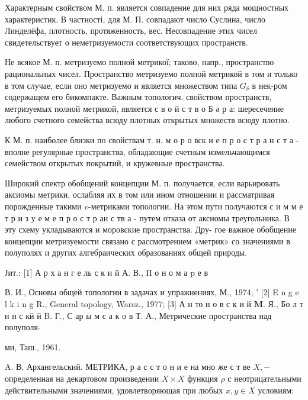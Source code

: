 \documentclass[10pt]{article}
\begin{document}
Характерным свойством М. п. является совпадение для них ряда мощностных характеристик. В частності, для М. П. совпадают число Суслина, число Линделёфа, плотность, протяженность, вес. Несовпадение этих чисел свидетельствует о неметризуемости соответствующих пространств.



Не всякое М. п. метризуемо полной метрикої; таково, напр., пространство рациональных чисел. Пространство метризуемо полной метрикой в том и только в том случае, если оно метризуемо и является множеством типа $G_{\delta}$ в нек-ром содержащем его бикомпакте. Важным топологич. свойством пространств, метризуемых полной метрикой, является с в о й с т в о Б ә р а: шересечение любого счетного семейства всюду плотных открытых множеств всюду плотно.



К М. п. наиболее близки по свойствам т. н. м о р о вск и е п р о с т р а н с т а - вполне регулярные пространства, обладающие счетным измельчающимся семейством открытых покрытий, и кружевные пространства.



Широкий спектр обобщений концепции М. п. получается, если варьировать аксиомы метрики, ослабляя их в том или ином отношении и рассматривая порожденные такими $v$-метриками топологии. На этом пути получаются с и м м е т р и з у е м е п р о с т р ан с тв а - путем отказа от аксиомы треугольника. В эту схему укладываются и моровские пространства. Дру- гое важное обобщение концепции метризуемости связано с рассмотрением «метрик» со значениями в полуполях и других алгебраических образованиях общей природы.



Јит.: [1] А р х а н г е ль с к и й А. В., П о н о м а p е в

В. И., Основы общей топологии в задачах и упражнениях, М., 1974; ' [2] E n g e l k i n g R., General topology, Warsz., 1977; [3] А н то н о в с к и й $\mathbf{M}$. Я., Бо л т н н с кй й B. Г., С ар ы м с а к о в Т. А., Метрические пространства над полуполя-

ми, Таш., 1961.

A. В. Архангельский. МЕТРИКА, р а с с т о н и е на мно же с т ве $X,-$ определенная на декартовом произведении $X \times X$ функция $\rho$ с неотрицательными действительными значениями, удовлетворяющая при любых $x, y \in X$ условиям:
\end{document}
